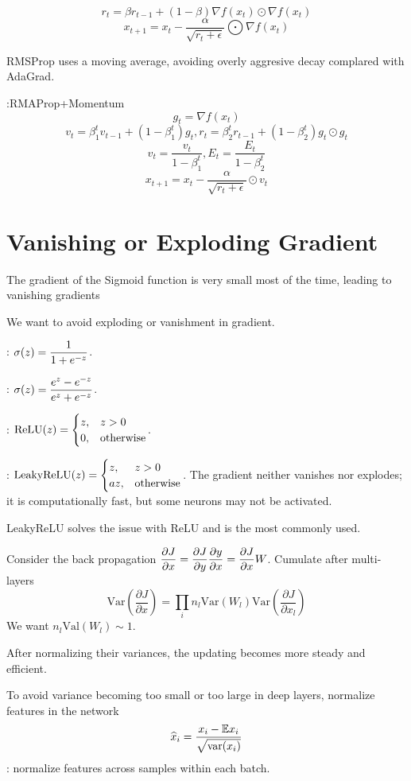 \[r_t=\beta r_{t-1}+(1-\beta)\nabla f(x_t)\odot \nabla f(x_t)\]
\[x_{t+1}=x_t-\frac{\alpha}{\sqrt{r_t+\epsilon}}\bigodot  \nabla f(x_t)\]

RMSProp uses a moving average, avoiding overly aggresive decay complared with AdaGrad.

:RMAProp+Momentum 
\[g_t=\nabla f(x_t)\]
\[v_t=\beta_1^t v_{t-1}+(1-\beta_1^t)g_t, r_t=\beta_2^t r_{t-1}+(1-\beta_2^t)g_t\odot g_t\]
\[v_t=\frac{v_t}{1-\beta_1^t},E_t=\frac{E_t}{1-\beta_2^t}\]
\[x_{t+1}=x_t-\frac{\alpha}{\sqrt{r_t+\epsilon}}\odot v_t\]

\section{Vanishing or Exploding Gradient}
The gradient of the Sigmoid function is very small most of the time, leading to vanishing gradients

We want to avoid exploding or vanishment in gradient.

: $ \displaystyle\sigma(z)=\frac{1}{1+e^{-z}} $.

: $ \displaystyle\sigma(z)=\frac{e^{z}-e^{-z}}{e^z+e^{-z}} $.

:  $ \displaystyle\mathrm{ReLU}(z)=\begin{cases}
    z,&z>0\\
    0,&\text{otherwise}
\end{cases} $.

: $ \displaystyle \mathrm{LeakyReLU}(z)=\begin{cases}
    z,&z>0\\
    az,&\text{otherwise}
\end{cases} $.
The gradient neither vanishes nor explodes; it is computationally fast, but some neurons may not be activated.

LeakyReLU solves the issue with ReLU and is the most commonly used.

Consider the back propagation  $ \displaystyle\frac{\partial J}{\partial x}=\frac{\partial J}{\partial y}\frac{\partial y}{\partial x}=\frac{\partial J}{\partial x}W$. Cumulate after multi-layers
\[\mathrm{Var}(\frac{\partial J}{\partial x})=\prod_i n_l \mathrm{Var}(W_l)\mathrm{Var}(\frac{\partial J}{\partial x_l})\]
We want   $ n_l\mathrm{Val}(W_l)\sim 1 $. 

After normalizing their variances, the updating becomes more steady and efficient.

To avoid variance becoming too small or too large in deep layers, normalize features in the network 
\[\widehat{x}_i=\frac{x_i-\mathbb E x_i}{\sqrt{\mathrm{var}(x_i)}}\]
: normalize features across samples within each batch.



